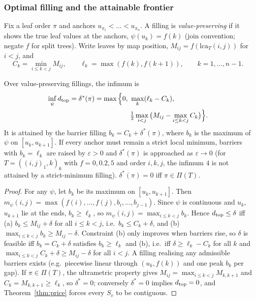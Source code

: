 \subsubsection{Optimal filling and the attainable frontier}
Fix a leaf order $\pi$ and anchors $u_{\pi_1}<\dots<u_{\pi_n}$. A filling is \emph{value-preserving} if it shows the true leaf values at the anchors, $\psi(u_k)=f(k)$ (join convention; negate $f$ for split trees). Write leaves by map position, $M_{ij}=f(\mathrm{lca}_T(i,j))$ for $i<j$, and
\[C_k=\min_{i\le k<j}M_{ij},\qquad \ell_k=\max(f(k),f(k+1)),\qquad k=1,\dots,n-1.\]
\begin{proposition}\label{prop:fill}
Over value-preserving fillings, the infimum is
\begin{equation}\begin{split}
\inf_\psi d_{\rm top}=\delta^*(\pi)=\max\Big\{0,\ &\max_k(\ell_k-C_k),\\
&\tfrac12\max_{i<j}\big(M_{ij}-\max_{i\le k<j}C_k\big)\Big\}.
\end{split}\end{equation}
It is attained by the barrier filling $b_k=C_k+\delta^*(\pi)$, where $b_k$ is the maximum of $\psi$ on $[u_k,u_{k+1}]$. If every anchor must remain a strict local minimum, barriers with $b_k=\ell_k$ are raised by $\varepsilon>0$ and $\delta^*(\pi)$ is approached as $\varepsilon\to0$ (for $T=((i,j)_1,k)_6$ with $f=0,0.2,5$ and order $i,k,j$, the infimum $4$ is not attained by a strict-minimum filling). $\delta^*(\pi)=0$ iff $\pi\in\Pi(T)$.
\end{proposition}
\begin{proof}For any $\psi$, let $b_k$ be its maximum on $[u_k,u_{k+1}]$. Then $m_\psi(i,j)=\max(f(i),\dots,f(j),b_i,\dots,b_{j-1})$. Since $\psi$ is continuous and $u_k$, $u_{k+1}$ lie at the ends, $b_k\ge\ell_k$, so $m_\psi(i,j)=\max_{i\le k<j}b_k$. Hence $d_{\rm top}\le\delta$ iff (a) $b_k\le M_{ij}+\delta$ for all $i\le k<j$, i.e.\ $b_k\le C_k+\delta$, and (b) $\max_{i\le k<j}b_k\ge M_{ij}-\delta$. Constraint (b) only improves when barriers rise, so $\delta$ is feasible iff $b_k=C_k+\delta$ satisfies $b_k\ge\ell_k$ and (b), i.e.\ iff $\delta\ge\ell_k-C_k$ for all $k$ and $\max_{i\le k<j}C_k+\delta\ge M_{ij}-\delta$ for all $i<j$. A filling realising any admissible barriers exists (e.g.\ piecewise linear through $(u_k,f(k))$ and one peak $b_k$ per gap). If $\pi\in\Pi(T)$, the ultrametric property gives $M_{ij}=\max_{i\le k<j}M_{k,k+1}$ and $C_k=M_{k,k+1}\ge\ell_k$, so $\delta^*=0$; conversely $\delta^*=0$ implies $d_{\rm top}=0$, and Theorem~\ref{thm:price} forces every $S_v$ to be contiguous.\end{proof}
